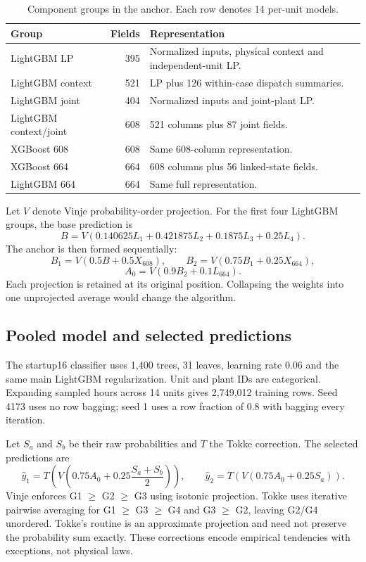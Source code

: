 \documentclass[a4paper,11pt]{article}
\begin{document}
\begin{table}[ht]
\centering\small
\begin{tabular}{p{40mm}rp{86mm}}
\hline
Group & Fields & Representation\\\hline
LightGBM LP & 395 & Normalized inputs, physical context and independent-unit LP.\\
LightGBM context & 521 & LP plus 126 within-case dispatch summaries.\\
LightGBM joint & 404 & Normalized inputs and joint-plant LP.\\
LightGBM context/joint & 608 & 521 columns plus 87 joint fields.\\
XGBoost 608 & 608 & Same 608-column representation.\\
XGBoost 664 & 664 & 608 columns plus 56 linked-state fields.\\
LightGBM 664 & 664 & Same full representation.\\\hline
\end{tabular}
\caption{Component groups in the anchor. Each row denotes 14 per-unit models.}
\end{table}

Let $V$ denote Vinje probability-order projection. For the first four LightGBM groups, the base prediction is
\[
 B=V(0.140625L_1+0.421875L_2+0.1875L_3+0.25L_4).
\]
The anchor is then formed sequentially:
\[
 B_1=V(0.5B+0.5X_{608}),\qquad
 B_2=V(0.75B_1+0.25X_{664}),
\]
\[
 A_0=V(0.9B_2+0.1L_{664}).
\]
Each projection is retained at its original position. Collapsing the weights into one unprojected average would change the algorithm.

\subsection*{Pooled model and selected predictions}
The startup16 classifier uses 1,400 trees, 31 leaves, learning rate 0.06 and the same main LightGBM regularization. Unit and plant IDs are categorical. Expanding sampled hours across 14 units gives 2,749,012 training rows. Seed 4173 uses no row bagging; seed 1 uses a row fraction of 0.8 with bagging every iteration.

Let $S_a$ and $S_b$ be their raw probabilities and $T$ the Tokke correction. The selected predictions are
\[
 \widehat y_1=T\left(V\left(0.75A_0+0.25\frac{S_a+S_b}{2}\right)\right),
 \qquad
 \widehat y_2=T\left(V(0.75A_0+0.25S_a)\right).
\]
Vinje enforces G1 $\geq$ G2 $\geq$ G3 using isotonic projection. Tokke uses iterative pairwise averaging for G1 $\geq$ G3 $\geq$ G4 and G3 $\geq$ G2, leaving G2/G4 unordered. Tokke's routine is an approximate projection and need not preserve the probability sum exactly. These corrections encode empirical tendencies with exceptions, not physical laws.
\end{document}
